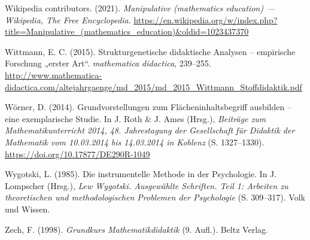 \documentclass[
]{scrbook}
\newlength{\cslhangindent}
\newlength{\cslentryspacingunit} %
\newenvironment{CSLReferences}[2] %
 {%
  \setlength{\parindent}{0pt}
  \ifodd #1
  \let\oldpar\par
  \def\par{\hangindent=\cslhangindent\oldpar}
  \fi
  \setlength{\parskip}{#2\cslentryspacingunit}
 }%
 {}
\theoremstyle{definition}
\theoremstyle{definition}
\theoremstyle{definition}
\theoremstyle{definition}
\theoremstyle{remark}
\begin{document}
\begin{CSLReferences}{1}{0}
\leavevmode{}%
Wikipedia contributors. (2021). \emph{Manipulative (mathematics education) --- {Wikipedia}{,} The Free Encyclopedia}. \url{https://en.wikipedia.org/w/index.php?title=Manipulative_(mathematics_education)\&oldid=1023437370}

\leavevmode{}%
Wittmann, E. C. (2015). Strukturgenetische didaktische {Analysen} -- empirische {Forschung} „erster {Art}``. \emph{mathematica didactica}, 239--255. \url{http://www.mathematica-didactica.com/altejahrgaenge/md_2015/md_2015_Wittmann_Stoffdidaktik.pdf}

\leavevmode{}%
Wörner, D. (2014). Grundvorstellungen zum {Flächeninhaltsbegriff} ausbilden -- eine exemplarische {Studie}. In J. Roth \& J. Ames (Hrsg.), \emph{Beiträge zum {Mathematikunterricht} 2014, 48. {Jahrestagung} der {Gesellschaft} für {Didaktik} der {Mathematik} vom 10.03.2014 bis 14.03.2014 in {Koblenz}} (S. 1327--1330). \url{https://doi.org/10.17877/DE290R-1049}

\leavevmode{}%
Wygotski, L. (1985). Die instrumentelle {Methode} in der {Psychologie}. In J. Lompscher (Hrsg.), \emph{Lew {Wygotski}. {Ausgewählte} {Schriften}. {Teil} 1: {Arbeiten} zu theoretischen und methodologischen {Problemen} der {Psychologie}} (S. 309--317). Volk und Wissen.

\leavevmode{}%
Zech, F. (1998). \emph{Grundkurs {Mathematikdidaktik}} (9. Aufl.). Beltz Verlag.

\end{CSLReferences}

\end{document}
